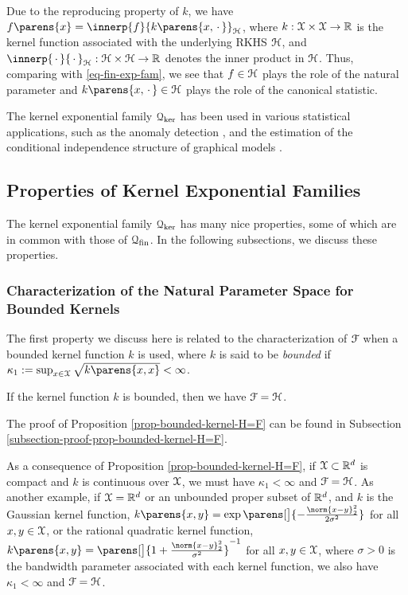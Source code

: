 Due to the reproducing property of $k$, we have $f \parens{x} = \innerp{f}{k \parens{x, \,\cdot\,}}_{\calH}$, where $k: \mathcal{X} \times \mathcal{X} \to \mathbb{R}$ is the kernel function associated with the underlying RKHS $\mathcal{H}$, and $\innerp{\,\cdot\,}{\,\cdot\,}_{\calH}: \calH \times \calH \to \Real$ denotes the inner product in $\mathcal{H}$. Thus, comparing with \eqref{eq-fin-exp-fam}, we see that $f \in \mathcal{H}$ plays the role of the natural parameter and $k \parens{x, \,\cdot\,} \in \calH$ plays the role of the canonical statistic. 

The kernel exponential family $\mathcal{Q}_{\ker}$ has been used in various statistical applications, such as the anomaly detection \parencites{Canu2006-ig}, and the estimation of the conditional independence structure of graphical models \parencites{Sun15-dc}. 


\subsection{Properties of Kernel Exponential Families}

The kernel exponential family $\mathcal{Q}_{\ker}$ has many nice properties, some of which are in common with those of $\mathcal{Q}_{\mathrm{fin}}$. In the following subsections, we discuss these properties. 

\subsubsection{Characterization of the Natural Parameter Space for Bounded Kernels}

The first property we discuss here is related to the characterization of $\mathcal{F}$ when a bounded kernel function $k$ is used, where $k$ is said to be \emph{bounded} if $\kappa_1 := \sup_{x \in \calX} \sqrt{k \parens{x, x}} < \infty$. 

\begin{proposition}\label{prop-bounded-kernel-H=F}
	If the kernel function $k$ is bounded, then we have $\mathcal{F} = \mathcal{H}$. 
\end{proposition}

The proof of Proposition \ref{prop-bounded-kernel-H=F} can be found in Subsection \ref{subsection-proof-prop-bounded-kernel-H=F}. 

As a consequence of Proposition \ref{prop-bounded-kernel-H=F}, if $\mathcal{X} \subset \mathbb{R}^d$ is compact and $k$ is continuous over $\mathcal{X}$, we must have $\kappa_1 < \infty$ and $\mathcal{F} = \mathcal{H}$. As another example, if $\mathcal{X} = \mathbb{R}^d$ or an unbounded proper subset of $\mathbb{R}^d$, and $k$ is the Gaussian kernel function, $k \parens{x, y} = \exp \parens[\big]{- \frac{\norm{x - y}_2^2}{2 \sigma^2}}$ for all $x, y \in \mathcal{X}$, or the rational quadratic kernel function, $k \parens{x, y} = \parens[\big]{1 + \frac{\norm{x - y}_2^2}{\sigma^2}}^{-1}$ for all $x, y \in \mathcal{X}$, 
	where $\sigma > 0$ is the bandwidth parameter associated with each kernel function, we also have $\kappa_1 < \infty$ and $\mathcal{F} = \mathcal{H}$. 


